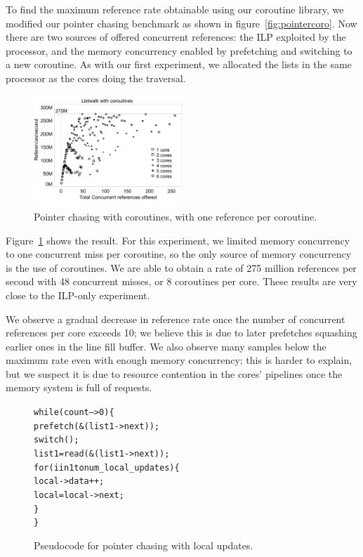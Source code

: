 \documentclass{acm_proc_article-sp}
\begin{document}
To find the maximum reference rate obtainable using our coroutine
library, we modified our pointer chasing benchmark as shown in
figure~\ref{fig:pointercoro}. Now there are two sources of offered
concurrent references: the ILP exploited by the processor, and the
memory concurrency enabled by prefetching and switching to a new
coroutine. As with our first experiment, we allocated the lists in the
same processor as the cores doing the traversal. 

\begin{figure}[h]
  \begin{center}
    \includegraphics[width=0.5\textwidth]{figures/multi-green-edited.pdf}
  \end{center}
  \caption{Pointer chasing with coroutines, with one reference per
    coroutine.}
  \label{fig:multi-green}
\end{figure}

Figure~\ref{fig:multi-green} shows the result. For this
experiment, we limited memory concurrency to one concurrent miss per
coroutine, so the only source of memory concurrency is the use of
coroutines. We are able to obtain a rate of 275 million references per
second with 48 concurrent misses, or 8 coroutines per core. These
results are very close to the ILP-only experiment.

We observe a gradual decrease in reference rate once the number of
concurrent references per core exceeds 10; we believe this is due to
later prefetches squashing earlier ones in the line fill buffer. We
also observe many samples below the maximum rate even with enough
memory concurrency; this is harder to explain, but we suspect it is
due to resource contention in the cores' pipelines once the memory
system is full of requests.

\begin{figure}
\begin{alltt}
  while (count-- > 0) \{
    prefetch(&(list1->next));
    switch();
    list1 = read(&(list1->next));
    for( i in 1 to num_local_updates ) \{
      local->data++;
      local = local->next;
   \}
  \}
\end{alltt}
\caption{Pseudocode for pointer chasing with local updates.}
\label{pointerupdate}
\end{figure}
\end{document}

